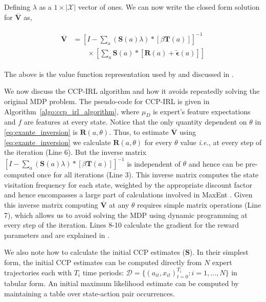 \documentclass{article}
\begin{document}
Defining $\lambda$ as a $1\times|\mathcal{X}|$ vector of ones.
We can now write the closed form solution for $\overline{\mathbf{V}}$ as,

\begin{align} \label{eq:exante_inversion}
\begin{split}
\overline{\mathbf{V}} &=\left[I-\sum_{a}(\mathbf{S}(a) \lambda) *\left[ \beta \mathbf{T}(a)  \right]\right]^{-1} \\
& \qquad \times \left[\sum_{a}\mathbf{S}(a) *\left[ \mathbf{R}(a)+\tilde{\bm{\epsilon}}(a)\right]\right]
\end{split}
\end{align}

The above is the value function representation used by \cite{pese} and discussed in \cite{arcidiacono}.


We now discuss the CCP-IRL algorithm and how it avoids repeatedly solving the original MDP problem.
The pseudo-code for CCP-IRL is given in Algorithm~\ref{algo:ccp_irl_algorithm}, where $\mu_D$ is expert's feature expectations and $f$ are features at every state.
Notice that the only quantity dependent on $\theta$ in \eqref{eq:exante_inversion} is $\mathbf{R}(a, \theta)$.
Thus, to estimate $\mathbf{\overline{V}}$ using \eqref{eq:exante_inversion} we calculate $\mathbf{R}(a, \theta)$ for every $\theta$ value \emph{i.e.}, at every step of the iteration (Line 6).
But the inverse matrix $\left[I-\sum_{a}(\mathbf{S}(a) \lambda) *\left[ \beta \mathbf{T}(a)  \right]\right]^{-1}$ is independent of $\theta$ and hence can be pre-computed once for all iterations (Line 3).
This inverse matrix computes the state visitation frequency for each state, weighted by the appropriate discount factor and hence encompasses a large part of calculations involved in MaxEnt \cite{ziebart_phd}.
Given this inverse matrix computing $\mathbf{\overline{V}}$ at any $\theta$ requires simple matrix operations (Line 7), which allows us to avoid solving the MDP using dynamic programming at every step of the iteration.
Lines 8-10 calculate the gradient for the reward parameters and are explained in \cite{kitani2012activity}.

We also note how to calculate the initial CCP estimates ($\mathbf{S}$). In their simplest form, the initial CCP estimates can be computed directly from $N$ expert trajectories each with $T_i$ time periods:  $\mathcal{D} = \{(a_{it},x_{it})_{t=0}^{T_i}:i=1,\dots,N\}$ in tabular form. An initial maximum likelihood estimate can be computed by maintaining a table over state-action pair occurrences.
\end{document}
